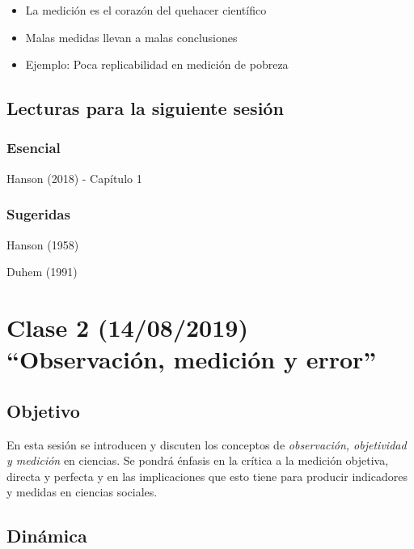 \documentclass[11pt,]{article}
\providecommand{\tightlist}{%
  \setlength{\itemsep}{0pt}\setlength{\parskip}{0pt}}
\begin{document}
\begin{itemize}
\tightlist
\item
  La medición es el corazón del quehacer científico
\item
  Malas medidas llevan a malas conclusiones
\item
  Ejemplo: Poca replicabilidad en medición de pobreza
\end{itemize}

\hypertarget{lecturas-para-la-siguiente-sesion}{%
\subsection{Lecturas para la siguiente
sesión}\label{lecturas-para-la-siguiente-sesion}}

\hypertarget{esencial}{%
\subsubsection{Esencial}\label{esencial}}

Hanson (2018) - Capítulo 1

\hypertarget{sugeridas}{%
\subsubsection{Sugeridas}\label{sugeridas}}

Hanson (1958)

Duhem (1991)

\hypertarget{clase-2-14082019-observacion-medicion-y-error}{%
\section{Clase 2 (14/08/2019) ``Observación, medición y
error''}\label{clase-2-14082019-observacion-medicion-y-error}}

\hypertarget{objetivo-1}{%
\subsection{Objetivo}\label{objetivo-1}}

En esta sesión se introducen y discuten los conceptos de
\emph{observación, objetividad y medición} en ciencias. Se pondrá
énfasis en la crítica a la medición objetiva, directa y perfecta y en
las implicaciones que esto tiene para producir indicadores y medidas en
ciencias sociales.

\hypertarget{dinamica-1}{%
\subsection{Dinámica}\label{dinamica-1}}
\end{document}

